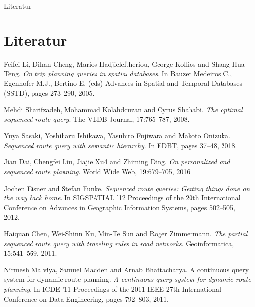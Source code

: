 \documentclass[18pt]{beamer}
\begin{document}
\appendix

\begin{frame}{Literatur}

	
	
	\section{Literatur}
	\begin{thebibliography}{9}
		
		Feifei Li, Dihan Cheng, Marios Hadjieleftheriou, George Kollios and Shang-Hua Teng.
		\textit{On trip planning queries in spatial databases}. 
		In Bauzer Medeiros C., Egenhofer M.J., Bertino E. (eds) Advances in Spatial and Temporal Databases (SSTD), pages 273–290, 2005.
		
		Mehdi Sharifzadeh, Mohammad Kolahdouzan and Cyrus Shahabi.
		\textit{The optimal sequenced route query}. 
		The VLDB Journal, 17:765–787, 2008.
		
		Yuya Sasaki, Yoshiharu Ishikawa, Yasuhiro Fujiwara and Makoto Onizuka.
		\textit{Sequenced route query with semantic hierarchy}. 
		In EDBT, pages 37–48, 2018.
		
		Jian Dai, Chengfei Liu, Jiajie Xu4 and Zhiming Ding.
		\textit{On personalized and sequenced route planning}. 
		World Wide Web, 19:679–705, 2016.
		
		Jochen Eisner and Stefan Funke.
		\textit{Sequenced route queries: Getting things done on the way back home}. 
		In SIGSPATIAL ’12 Proceedings of the 20th International Conference on Advances in Geographic Information Systems, pages 502–505, 2012.
		
		Haiquan Chen, Wei-Shinn Ku, Min-Te Sun and Roger Zimmermann.
		\textit{The partial sequenced route query with traveling rules in road networks}. 
		Geoinformatica, 15:541–569, 2011.
		
		Nirmesh Malviya, Samuel Madden and Arnab Bhattacharya. A continuous query system for dynamic route planning.
		\textit{A continuous query system for dynamic route planning}. 
		In ICDE ’11 Proceedings of the 2011 IEEE 27th International Conference on Data Engineering, pages 792–803, 2011.
		
	\end{thebibliography}
\end{frame}
\end{document}
